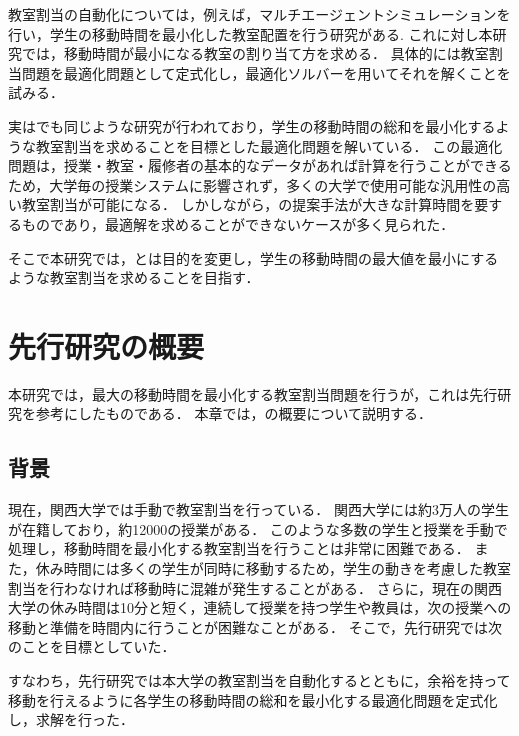 \documentclass[12pt, a4paper, fleqn]{jreport}
\begin{document}
教室割当の自動化については，例えば，マルチエージェントシミュレーションを行い，学生の移動時間を最小化した教室配置を行う研究がある\cite{kurousitemituketa}.
これに対し本研究では，移動時間が最小になる教室の割り当て方を求める．
具体的には教室割当問題を最適化問題として定式化し，最適化ソルバーを用いてそれを解くことを試みる．

実は\cite{先行研究}でも同じような研究が行われており，学生の移動時間の総和を最小化するような教室割当を求めることを目標とした最適化問題を解いている．
この最適化問題は，授業・教室・履修者の基本的なデータがあれば計算を行うことができるため，大学毎の授業システムに影響されず，多くの大学で使用可能な汎用性の高い教室割当が可能になる．
しかしながら，\cite{先行研究}の提案手法が大きな計算時間を要するものであり，最適解を求めることができないケースが多く見られた．

そこで本研究では，\cite{先行研究}とは目的を変更し，学生の移動時間の最大値を最小にするような教室割当を求めることを目指す．







\chapter{先行研究の概要}
本研究では，最大の移動時間を最小化する教室割当問題を行うが，これは先行研究\cite{先行研究}を参考にしたものである．
本章では，\cite{先行研究}の概要について説明する．
\section{背景}
現在，関西大学では手動で教室割当を行っている．
関西大学には約3万人の学生が在籍しており，約12000の授業がある．
このような多数の学生と授業を手動で処理し，移動時間を最小化する教室割当を行うことは非常に困難である．
また，休み時間には多くの学生が同時に移動するため，学生の動きを考慮した教室割当を行わなければ移動時に混雑が発生することがある．
さらに，現在の関西大学の休み時間は10分と短く，連続して授業を持つ学生や教員は，次の授業への移動と準備を時間内に行うことが困難なことがある．
そこで，先行研究では次のことを目標としていた．\\
\begin{center}
\end{center}
\vspace{5.0mm}
すなわち，先行研究では本大学の教室割当を自動化するとともに，余裕を持って移動を行えるように各学生の移動時間の総和を最小化する最適化問題を定式化し，求解を行った．
\end{document}
